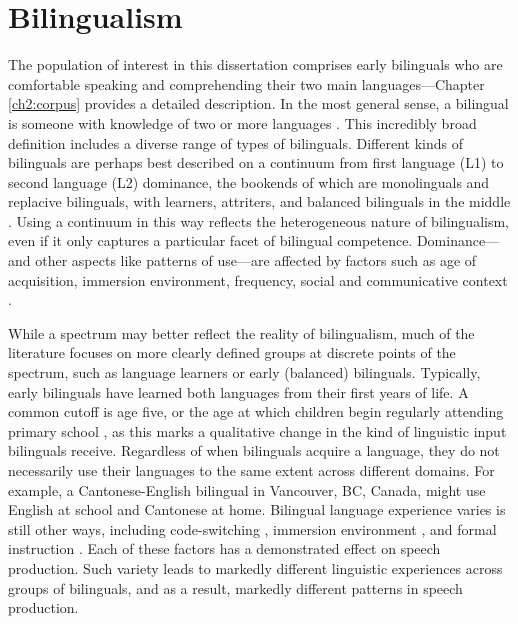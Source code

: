 \section{Bilingualism}\label{ch1:sec:bilingualism}

The population of interest in this dissertation comprises early bilinguals who are comfortable speaking and comprehending their two main languages---Chapter \ref{ch2:corpus} provides a detailed description. In the most general sense, a bilingual is someone with knowledge of two or more languages \citep{grosjean_1989_bilingual}. This incredibly broad definition includes a diverse range of types of bilinguals. Different kinds of bilinguals are perhaps best described on a continuum from first language (L1) to second language (L2) dominance, the bookends of which are monolinguals and replacive bilinguals, with learners, attriters, and balanced bilinguals in the middle \citep{gertken_2014_blp}. Using a continuum in this way reflects the heterogeneous nature of bilingualism, even if it only captures a particular facet of bilingual competence. Dominance---and other aspects like patterns of use---are affected by factors such as age of acquisition, immersion environment, frequency, social and communicative context \citep{gertken_2014_blp}. 

While a spectrum may better reflect the reality of bilingualism, much of the literature focuses on more clearly defined groups at discrete points of the spectrum, such as language learners or early (balanced) bilinguals. Typically, early bilinguals have learned both languages from their first years of life. A common cutoff is age five, or the age at which children begin regularly attending primary school \citep{amengual_2017_type}, as this marks a qualitative change in the kind of linguistic input bilinguals receive. Regardless of when bilinguals acquire a language, they do not necessarily use their languages to the same extent across different domains. For example, a Cantonese-English bilingual in Vancouver, BC, Canada, might use English at school and Cantonese at home. Bilingual language experience varies is still other ways, including code-switching \citep{fricke_2016_dimensions}, immersion environment \citep{sancier_1997_drift}, and formal instruction \citep{fricke_2019_bilingualism}. Each of these factors has a demonstrated effect on speech production. Such variety leads to markedly different linguistic experiences across groups of bilinguals, and as a result, markedly different patterns in speech production. 

